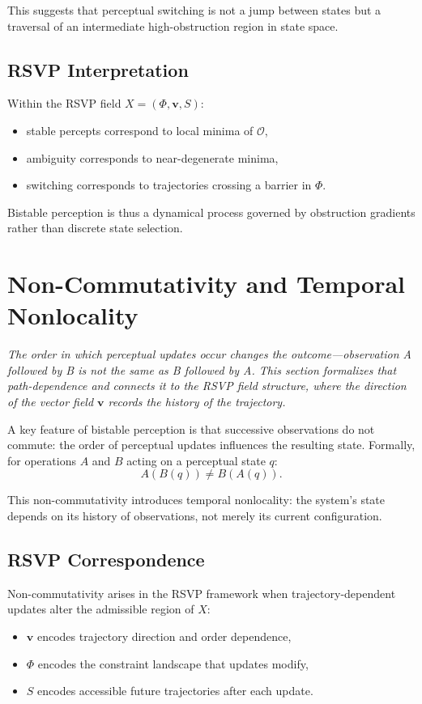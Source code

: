\documentclass[12pt,a4paper]{article}
\begin{document}
This suggests that perceptual switching is not a jump between states but a traversal of an intermediate high-obstruction region in state space.

\subsection{RSVP Interpretation}

Within the RSVP field $X = (\Phi, \mathbf{v}, S)$:
\begin{itemize}[noitemsep]
\item stable percepts correspond to local minima of $\mathcal{O}$,
\item ambiguity corresponds to near-degenerate minima,
\item switching corresponds to trajectories crossing a barrier in $\Phi$.
\end{itemize}

Bistable perception is thus a dynamical process governed by obstruction gradients rather than discrete state selection.

\section{Non-Commutativity and Temporal Nonlocality}
\label{sec:noncommutative}

\textit{The order in which perceptual updates occur changes the outcome---observation A followed by B is not the same as B followed by A. This section formalizes that path-dependence and connects it to the RSVP field structure, where the direction of the vector field $\mathbf{v}$ records the history of the trajectory.}

A key feature of bistable perception is that successive observations do not commute: the order of perceptual updates influences the resulting state. Formally, for operations $A$ and $B$ acting on a perceptual state $q$:
\[
A(B(q)) \neq B(A(q)).
\]

This non-commutativity introduces temporal nonlocality: the system's state depends on its history of observations, not merely its current configuration.

\subsection{RSVP Correspondence}

Non-commutativity arises in the RSVP framework when trajectory-dependent updates alter the admissible region of $X$:
\begin{itemize}[noitemsep]
\item $\mathbf{v}$ encodes trajectory direction and order dependence,
\item $\Phi$ encodes the constraint landscape that updates modify,
\item $S$ encodes accessible future trajectories after each update.
\end{itemize}
\end{document}
